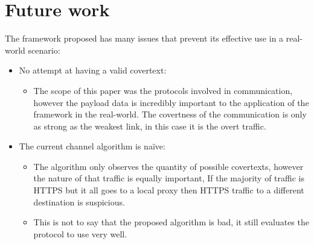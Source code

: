 \chapter{Future work}

The framework proposed has many issues that prevent its effective use in a real-world scenario:

\begin{itemize}
    \item No attempt at having a valid covertext:
    \begin{itemize}
        \item The scope of this paper was the protocols involved in communication, however the payload data is incredibly important to the application of the framework in the real-world. The covertness of the communication is only as strong as the weakest link, in this case it is the overt traffic.
    \end{itemize}
    \item The current channel algorithm is na\"ive:
    \begin{itemize}
        \item The algorithm only observes the quantity of possible covertexts, however the nature of that traffic is equally important, If the majority of traffic is HTTPS but it all goes to a local proxy then HTTPS traffic to a different destination is suspicious.
        \item This is not to say that the proposed algorithm is bad, it still evaluates the protocol to use very well.
    \end{itemize}
\end{itemize}